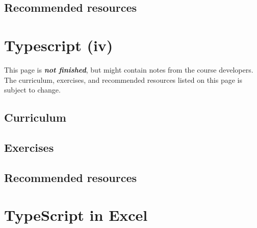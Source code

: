 \documentclass[
  letterpaper,
  DIV=11,
  numbers=noendperiod]{scrreprt}
\begin{document}
\hypertarget{recommended-resources-7}{%
\section{Recommended resources}\label{recommended-resources-7}}


\hypertarget{typescript-iv}{%
\chapter{Typescript (iv)}\label{typescript-iv}}

\begin{tcolorbox}[enhanced jigsaw, colbacktitle=quarto-callout-important-color!10!white, bottomrule=.15mm, toprule=.15mm, colback=white, coltitle=black, bottomtitle=1mm, colframe=quarto-callout-important-color-frame, opacitybacktitle=0.6, titlerule=0mm, left=2mm, title=\textcolor{quarto-callout-important-color}{\faExclamation}\hspace{0.5em}{Important}, opacityback=0, arc=.35mm, leftrule=.75mm, rightrule=.15mm, toptitle=1mm, breakable]

This page is \textbf{\emph{not finished}}, but might contain notes from
the course developers. The curriculum, exercises, and recommended
resources listed on this page is subject to change.

\end{tcolorbox}

\hypertarget{curriculum-10}{%
\section{Curriculum}\label{curriculum-10}}

\hypertarget{exercises-5}{%
\section{Exercises}\label{exercises-5}}

\hypertarget{recommended-resources-8}{%
\section{Recommended resources}\label{recommended-resources-8}}


\hypertarget{typescript-in-excel}{%
\chapter{TypeScript in Excel}\label{typescript-in-excel}}
\end{document}
